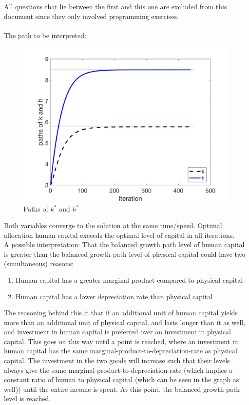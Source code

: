 \documentclass{article}
\begin{document}
 \subsection{}
 All questions that lie between the first and this one are excluded from this document since they only involved programming exercises. \\ \\
 The path to be interpreted:
 \begin{figure}[H]
\includegraphics[width=\textwidth,height=\textheight,keepaspectratio, center]{Q2Sub6.jpg} 
\caption{Paths of $k^*$ and $h^*$}
\end{figure}
\noindent Both variables converge to the solution at the same time/speed. Optimal allocation human capital exceeds the optimal level of capital in all iterations.\\ A possible interpretation: That the balanced growth path level of human capital is greater than the balanced growth path level of physical capital could have two (simultaneous) reasons:
\begin{enumerate}
\item Human capital has a greater marginal product compared to physical capital
\item Human capital has a lower depreciation rate than physical capital
\end{enumerate}
The reasoning behind this it that if an additional unit of human capital yields more than an additional unit of physical capital, and lasts longer than it as well, and investment in human capital is preferred over an investment in physical capital. This goes on this way until a point is reached, where an investment in human capital has the same marginal-product-to-depreciation-rate as physical capital. The investment in the two goods will increase such that their levels always give the same marginal-product-to-depreciation-rate (which implies a constant ratio of human to physical capital (which can be seen in the graph as well)) until the entire income is spent. At this point, the balanced growth path level is reached.
\end{document}
